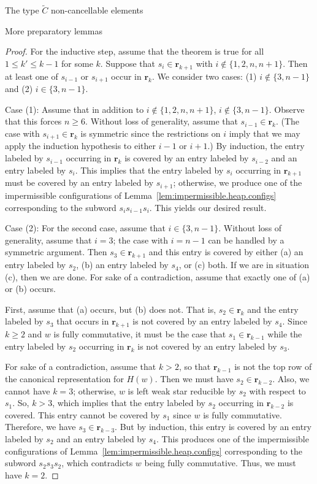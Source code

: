 \documentclass[12pt]{amsart}
\newcommand{\C}{\widetilde{C}}
\renewcommand{\(}{\left(}
\renewcommand{\)}{\right)}
\renewcommand{\r}{\mathbf{r}}
\begin{document}
\begin{section}{The type $\C$ non-cancellable elements}
\begin{subsection}{More preparatory lemmas}
\begin{proof}
For the inductive step, assume that the theorem is true for all $1 \leq k' \leq k-1$ for some $k$.  Suppose that $s_{i} \in \r_{k+1}$ with $i \notin \{1,2, n, n+1\}$.  Then at least one of $s_{i-1}$ or $s_{i+1}$ occur in $\r_{k}$.  We consider two cases: (1) $i \notin \{3,n-1\}$ and (2) $i  \in \{3,n-1\}$.

Case (1): Assume that in addition to $i \notin \{1,2,n,n+1\}$, $i \notin \{3,n-1\}$.  Observe that this forces $n \geq 6$.  Without loss of generality, assume that $s_{i-1} \in \r_{k}$.  (The case with $s_{i+1} \in \r_{k}$ is symmetric since the restrictions on $i$ imply that we may apply the induction hypothesis to either $i-1$ or $i+1$.)  By induction, the entry labeled by $s_{i-1}$ occurring in $\r_{k}$ is covered by an entry labeled by $s_{i-2}$ and an entry labeled by $s_{i}$.  This implies that the entry labeled by $s_{i}$ occurring in $\r_{k+1}$ must be covered by an entry labeled by $s_{i+1}$; otherwise, we produce one of the impermissible configurations of Lemma~\ref{lem:impermissible.heap.configs} corresponding to the subword $s_{i}s_{i-1}s_{i}$.  This yields our desired result.

Case (2):  For the second case, assume that $i \in \{3, n-1\}$.  Without loss of generality, assume that $i=3$; the case with $i=n-1$ can be handled by a symmetric argument.  Then $s_{3} \in \r_{k+1}$ and this entry is covered by either (a) an entry labeled by $s_{2}$, (b) an entry labeled by $s_{4}$, or (c) both.  If we are in situation (c), then we are done.  For sake of a contradiction, assume that exactly one of (a) or (b) occurs.

First, assume that (a) occurs, but (b) does not.  That is, $s_{2} \in \r_k$ and the entry labeled by $s_{3}$ that occurs in $\r_{k+1}$ is not covered by an entry labeled by $s_{4}$.  Since $k \geq 2$ and $w$ is fully commutative, it must be the case that $s_1\in\r_{k-1}$ while the entry labeled by $s_2$ occurring in $\r_k$ is not covered by an entry labeled by $s_3$.

For sake of a contradiction, assume that $k > 2$, so that $\r_{k-1}$ is not the top row of the canonical representation for $H(w)$.  Then we must have $s_{2} \in \r_{k-2}$.  Also, we cannot have $k=3$; otherwise, $w$ is left weak star reducible by $s_{2}$ with respect to $s_{1}$.  So, $k>3$, which implies that the entry labeled by $s_{2}$ occurring in $\r_{k-2}$ is covered.  This entry cannot be covered by $s_{1}$ since $w$ is fully commutative.  Therefore, we have $s_{3} \in \r_{k-3}$.  But by induction, this entry is covered by an entry labeled by $s_{2}$ and an entry labeled by $s_{4}$.  This produces one of the impermissible configurations of Lemma~\ref{lem:impermissible.heap.configs} corresponding to the subword $s_{2}s_{3}s_{2}$, which contradicts $w$ being fully commutative.  Thus, we must have $k=2$.  


\end{proof}
\end{subsection}
\end{section}
\end{document}
